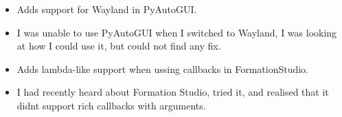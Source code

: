 \documentclass[10pt,a4paper,withhyper]{altacv}
\begin{document}
\begin{paracol}{2}
\medskip













\begin{itemize}
\item Adds support for Wayland in PyAutoGUI.
\item I was unable to use PyAutoGUI when I switched to Wayland, I was looking at how I could use it, but could not find any fix.
\end{itemize}

\begin{itemize}
\item Adds lambda-like support when ussing callbacks in FormationStudio.
\item I had recently heard about Formation Studio, tried it, and realised that it didnt support rich callbacks with arguments.
\end{itemize}


\end{paracol}
\end{document}

